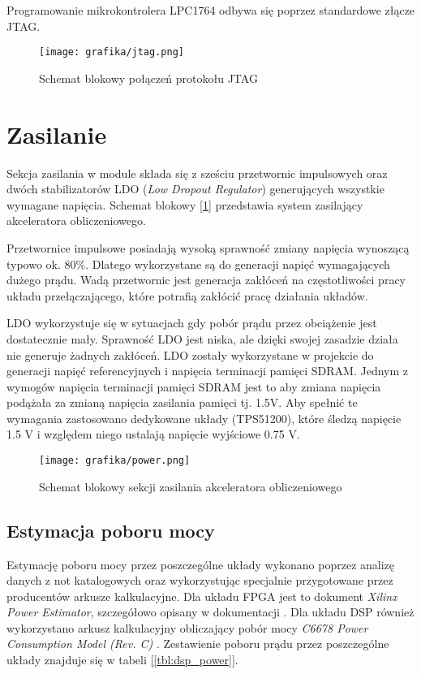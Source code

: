 Programowanie mikrokontrolera LPC1764 odbywa się poprzez standardowe złącze JTAG.

\begin{figure}[!ht]
\centering
\texttt{[image: grafika/jtag.png]}
\caption{Schemat blokowy połączeń protokołu JTAG}
\end{figure}

\section{Zasilanie}
Sekcja zasilania w module składa się z sześciu przetwornic impulsowych oraz dwóch stabilizatorów LDO (\textit{Low Dropout Regulator}) generujących wszystkie wymagane napięcia. Schemat blokowy [\ref{POWER_BLOCK}] przedstawia system zasilający akceleratora obliczeniowego. 

Przetwornice impulsowe posiadają wysoką sprawność zmiany napięcia wynoszącą typowo ok. 80\%. Dlatego wykorzystane są do generacji napięć wymagających dużego prądu. Wadą przetwornic jest generacja zakłóceń na częstotliwości pracy układu przełączającego, które potrafią zakłócić pracę działania układów.

  LDO wykorzystuje się w sytuacjach gdy pobór prądu przez obciążenie jest dostatecznie mały. Sprawność LDO jest niska, ale dzięki swojej zasadzie działa nie generuje żadnych zakłóceń. LDO zostały wykorzystane w projekcie do generacji napięć referencyjnych i napięcia terminacji pamięci SDRAM. Jednym z wymogów napięcia terminacji pamięci SDRAM jest to aby zmiana napięcia podążała za zmianą napięcia zasilania pamięci tj. 1.5V. Aby spełnić te wymagania zastosowano dedykowane układy (TPS51200), które śledzą napięcie 1.5 V i względem niego ustalają napięcie wyjściowe 0.75 V.  

\begin{figure}[!ht]
\centering
\texttt{[image: grafika/power.png]}
\caption{Schemat blokowy sekcji zasilania akceleratora obliczeniowego}
\label{POWER_BLOCK}
\end{figure}

\subsection{Estymacja poboru mocy}
Estymację  poboru mocy przez poszczególne układy wykonano poprzez analizę danych z not katalogowych oraz wykorzystując specjalnie przygotowane przez producentów arkusze kalkulacyjne. Dla układu FPGA jest to dokument \textit{Xilinx Power Estimator}, szczegółowo opisany w dokumentacji \cite{XPE}  \cite{XPE:UG1} \cite{XPE:UG2}. Dla układu DSP  również wykorzystano arkusz kalkulacyjny obliczający pobór mocy \textit{C6678 Power Consumption Model (Rev. C)} \cite{DSP:POWER}. Zestawienie poboru prądu przez poszczególne układy znajduje się w tabeli [\ref{tbl:dsp_power}].


